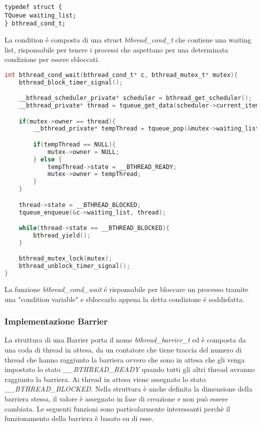 \documentclass{article}
\begin{document}
\begin{lstlisting}
typedef struct {
TQueue waiting_list;
} bthread_cond_t;
\end{lstlisting}
La condition é composta di una struct \textit{bthread\_cond\_t} che contiene una waiting list, risponsabile per tenere i processi che aspettano per una determinata condizione per essere sbloccati.

\begin{lstlisting}[language=C]
int bthread_cond_wait(bthread_cond_t* c, bthread_mutex_t* mutex){
    bthread_block_timer_signal();

    __bthread_scheduler_private* scheduler = bthread_get_scheduler();
    __bthread_private* thread = tqueue_get_data(scheduler->current_item);

    if(mutex->owner == thread){
        __bthread_private* tempThread = tqueue_pop(&mutex->waiting_list);

        if(tempThread == NULL){
            mutex->owner = NULL;
        } else {
            tempThread->state = __BTHREAD_READY;
            mutex->owner = tempThread;
        }
    }

    thread->state = __BTHREAD_BLOCKED;
    tqueue_enqueue(&c->waiting_list, thread);

    while(thread->state == __BTHREAD_BLOCKED){
        bthread_yield();
    }

    bthread_mutex_lock(mutex);
    bthread_unblock_timer_signal();
}

\end{lstlisting}
La funzione \textit{bthread\_cond\_wait} é risponsabile per bloccare un processo tramite una "condition variable" e sbloccarlo appena la detta condizione é soddisfatta.


\vspace{2mm}

\subsubsection{Implementazione Barrier}

La struttura di una Barrier porta il nome \textit{bthread\_barrier\_t} ed è composta da una coda di thread in attesa, da un contatore che tiene traccia del numero di thread che hanno raggiunto la barriera ovvero che sono in attesa che gli venga impostato lo stato \textit{\_\_BTHREAD\_READY} quando tutti gli altri thread avranno raggiunto la barriera. Ai thread in attesa viene assegnato lo stato \textit{\_\_BTHREAD\_BLOCKED}.
Nella struttura è anche definita la dimensione della barriera stessa, il valore è assegnato in fase di creazione e non può essere cambiata. Le seguenti funzioni sono particolarmente interessanti perchè il funzionamento della barriera è basato su di esse.
\end{document}
